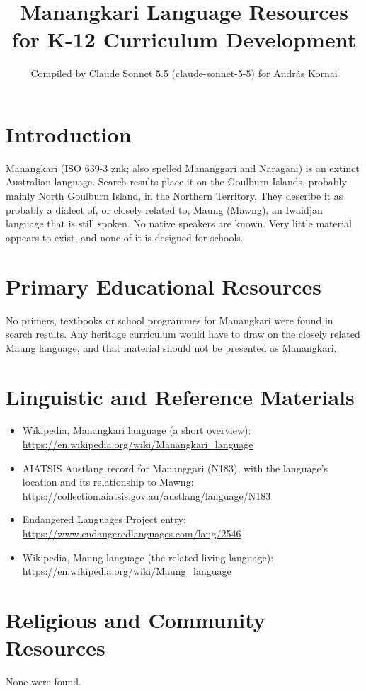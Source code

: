 \documentclass[12pt]{article}
\title{Manangkari Language Resources for K-12 Curriculum Development}
\author{Compiled by Claude Sonnet 5.5 (claude-sonnet-5-5) for Andr\'as Kornai}
\date{}
\begin{document}
\maketitle

\section{Introduction}
Manangkari (ISO 639-3 znk; also spelled Mananggari and Naragani) is an extinct Australian language. Search results place it on the Goulburn Islands, probably mainly North Goulburn Island, in the Northern Territory. They describe it as probably a dialect of, or closely related to, Maung (Mawng), an Iwaidjan language that is still spoken. No native speakers are known. Very little material appears to exist, and none of it is designed for schools.

\section{Primary Educational Resources}
No primers, textbooks or school programmes for Manangkari were found in search results. Any heritage curriculum would have to draw on the closely related Maung language, and that material should not be presented as Manangkari.

\section{Linguistic and Reference Materials}
\begin{itemize}
\item Wikipedia, Manangkari language (a short overview): \url{https://en.wikipedia.org/wiki/Manangkari_language}
\item AIATSIS Austlang record for Mananggari (N183), with the language's location and its relationship to Mawng: \url{https://collection.aiatsis.gov.au/austlang/language/N183}
\item Endangered Languages Project entry: \url{https://www.endangeredlanguages.com/lang/2546}
\item Wikipedia, Maung language (the related living language): \url{https://en.wikipedia.org/wiki/Maung_language}
\end{itemize}

\section{Religious and Community Resources}
None were found.
\end{document}
